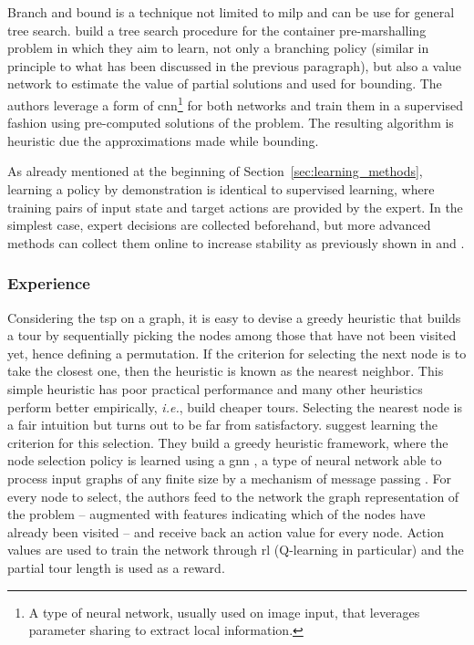 \documentclass[11pt]{article}
\begin{document}
		Branch and bound is a technique not limited to \gls{milp} and can be use for general
		tree search.
		\cite{HottungDeep2017} build a tree search procedure for the container pre-marshalling
		problem in which they aim to learn, not only a branching policy (similar in principle to what has
		been discussed in the previous paragraph), but also a value network to estimate the value of
		partial solutions and used for bounding.
		The authors leverage a form of \gls{cnn}\footnote{
		    A type of neural network, usually used on image input, that leverages parameter sharing to
		    extract local information.
		} for both networks and train them in a supervised fashion using pre-computed solutions
		of the problem.
		The resulting algorithm is heuristic due the approximations made while bounding.

		As already mentioned at the beginning of Section~\ref{sec:learning_methods}, learning a policy by
		demonstration is identical to supervised learning, where training pairs of input state and target
		actions are provided by the expert.
		In the simplest case, expert decisions are collected beforehand, but more advanced methods can
		collect them online to increase stability as previously shown in
		\cite{MarcosAlvarezOnlineLearningStrong2016} and \cite{HeLearningSearchBranch2014}.

		\subsubsection{Experience}
		\label{sec:experience}
		Considering the \gls{tsp} on a graph, it is easy to devise a greedy heuristic that builds a tour by
		sequentially picking the nodes among those that have not been visited yet, hence defining a
		permutation.
		If the criterion for selecting the next node is to take the closest one, then the heuristic is
		known as the nearest neighbor.
		This simple heuristic has poor practical performance and many other heuristics perform better
		empirically, \textit{i.e.}, build cheaper tours.
		Selecting the nearest node is a fair intuition but turns out to be far from satisfactory.
		\cite{KhalilLearningCombinatorialOptimization2017} suggest learning the criterion for this
		selection.
		They build a greedy heuristic framework, where the node selection policy is learned using a
		\gls{gnn} \citep{DaiDiscriminativeEmbeddingsLatent2016}, a type of neural network able to process
		input graphs of any finite size by a mechanism of message passing \citep{GilmerNeuralMessagePassing2017}.
		For every node to select, the authors feed to the network the graph representation of the problem
		-- augmented with features indicating which of the nodes have already been visited -- and receive
		back an action value for every node.
		Action values are used to train the network through \gls{rl} (Q-learning in particular) and the
		partial tour length is used as a reward.
\end{document}
